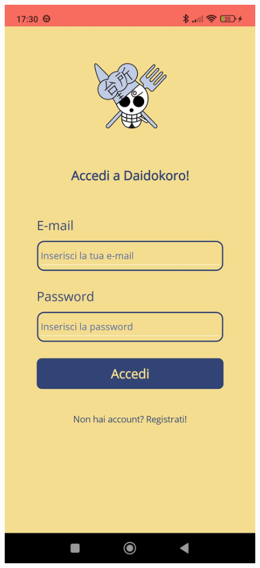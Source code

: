 ﻿\documentclass[a4paper,12pt]{report}
\begin{document}
\begin{figure}[h!]
    \begin{minipage}{.5\textwidth}
        \centering
        \includegraphics[width=0.9\linewidth]{app_images/Login.jpg}
    \end{minipage}

\end{figure}
\end{document}
